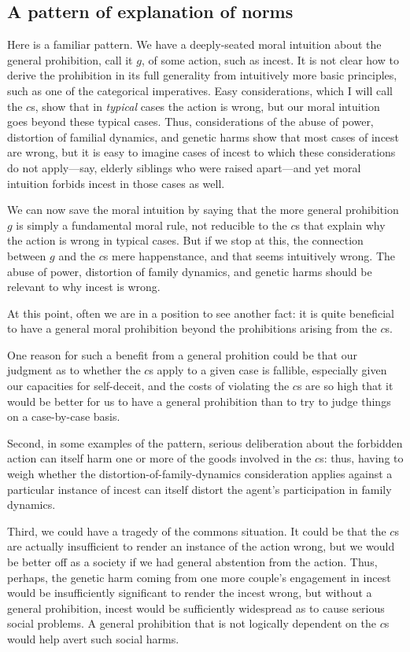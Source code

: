 \subsection{A pattern of explanation of norms}\label{sec:moral-explanation}
Here is a familiar pattern. We have a deeply-seated moral intuition about the general prohibition, call it $g$, of some action,
such as incest. It is not clear how to derive the prohibition in its full generality from intuitively more basic principles, such as one of 
the categorical imperatives. Easy considerations, which I will call the $c$s, show that in \textit{typical} cases the action is wrong,
but our moral intuition goes beyond these typical cases. Thus, considerations of the abuse of power, distortion of 
familial dynamics, and genetic harms show that most cases of incest are wrong, but it is easy to imagine cases
of incest to which these considerations do not apply---say, elderly siblings who were raised apart---and yet moral
intuition forbids incest in those cases as well.

We can now save the moral intuition by saying that the more general prohibition $g$ is simply a fundamental moral rule,
not reducible to the $c$s that explain why the action is wrong in typical cases. But if we stop
at this, the connection between $g$ and the $c$s mere happenstance, and that seems intuitively wrong. The abuse of 
power, distortion of family dynamics, and genetic harms should be relevant to why incest is wrong.

At this point, often we are in a position to see another fact: it is quite beneficial to have a 
general moral prohibition beyond the prohibitions arising from the $c$s. 

One reason for such a benefit from a general prohition could be that our judgment as to whether the $c$s apply to a given case is fallible, especially given our capacities
for self-deceit, and the costs of violating the $c$s are so high that it would be better for us to have a 
general prohibition than to try to judge things on a case-by-case basis. 

Second, in some examples of
the pattern, serious deliberation about the forbidden action can itself harm one or more of the goods
involved in the $c$s: thus, having to weigh whether the distortion-of-family-dynamics consideration
applies against a particular instance of incest can itself distort the agent's participation in family
dynamics. 

Third, we could have a tragedy of the commons situation. It could be that the $c$s are actually insufficient
to render an instance of the action wrong, but we would be better off as a society if we had general
abstention from the action. Thus, perhaps, the genetic harm coming from one more couple's engagement in incest
would be insufficiently significant to render the incest wrong, but without a general prohibition, incest
would be sufficiently widespread as to cause serious social problems. A general prohibition that is not
logically dependent on the $c$s would help avert such social harms.

